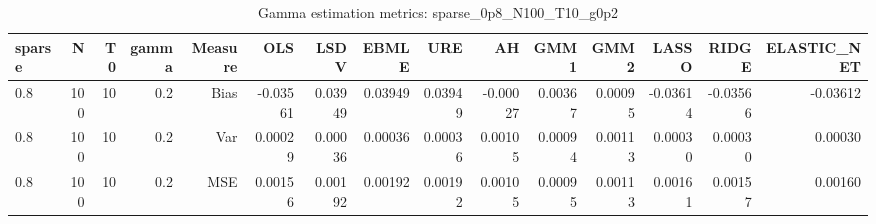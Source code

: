 \begin{table}[!htbp]\centering
\caption{Gamma estimation metrics: sparse_0p8_N100_T10_g0p2}
\label{tab:table1_sparse_0p8_N100_T10_g0p2}
\begin{tabular}{lrrrrrrrrrrrrrr}
\hline
sparse & N & T0 & gamma & Measure & OLS & LSDV & EBMLE & URE & AH & GMM1 & GMM2 & LASSO & RIDGE & ELASTIC_NET \\
\hline
0.8 & 100 & 10 & 0.2 & Bias & -0.03561 & 0.03949 & 0.03949 & 0.03949 & -0.00027 & 0.00367 & 0.00095 & -0.03614 & -0.03566 & -0.03612 \\
0.8 & 100 & 10 & 0.2 & Var & 0.00029 & 0.00036 & 0.00036 & 0.00036 & 0.00105 & 0.00094 & 0.00113 & 0.00030 & 0.00030 & 0.00030 \\
0.8 & 100 & 10 & 0.2 & MSE & 0.00156 & 0.00192 & 0.00192 & 0.00192 & 0.00105 & 0.00095 & 0.00113 & 0.00161 & 0.00157 & 0.00160 \\
\hline
\end{tabular}
\end{table}

